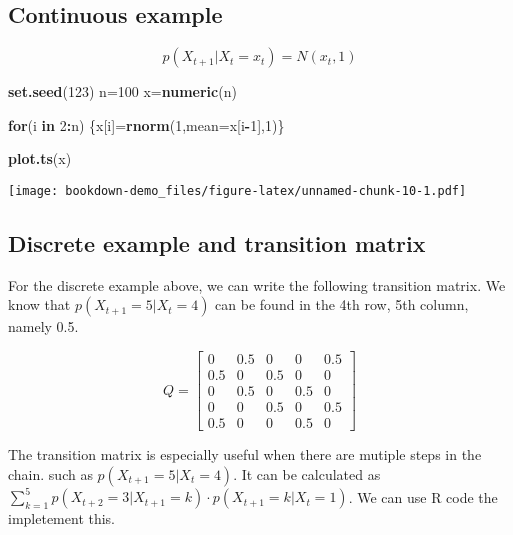 \documentclass[]{book}
\newenvironment{Shaded}{\begin{snugshade}}{\end{snugshade}}
\newcommand{\KeywordTok}[1]{\textcolor[rgb]{0.13,0.29,0.53}{\textbf{#1}}}
\newcommand{\DataTypeTok}[1]{\textcolor[rgb]{0.13,0.29,0.53}{#1}}
\newcommand{\DecValTok}[1]{\textcolor[rgb]{0.00,0.00,0.81}{#1}}
\newcommand{\ControlFlowTok}[1]{\textcolor[rgb]{0.13,0.29,0.53}{\textbf{#1}}}
\newcommand{\OperatorTok}[1]{\textcolor[rgb]{0.81,0.36,0.00}{\textbf{#1}}}
\newcommand{\NormalTok}[1]{#1}
\begin{document}
\subsection{Continuous example}\label{continuous-example}

\[p(X_{t+1}| X_t=x_t)=N(x_t,1)\]

\begin{Shaded}
\begin{Highlighting}[]
\KeywordTok{set.seed}\NormalTok{(}\DecValTok{123}\NormalTok{)}
\NormalTok{n=}\DecValTok{100}
\NormalTok{x=}\KeywordTok{numeric}\NormalTok{(n)}

\ControlFlowTok{for}\NormalTok{(i }\ControlFlowTok{in} \DecValTok{2}\OperatorTok{:}\NormalTok{n)}
\NormalTok{\{x[i]=}\KeywordTok{rnorm}\NormalTok{(}\DecValTok{1}\NormalTok{,}\DataTypeTok{mean=}\NormalTok{x[i}\OperatorTok{-}\DecValTok{1}\NormalTok{],}\DecValTok{1}\NormalTok{)\}}

\KeywordTok{plot.ts}\NormalTok{(x)}
\end{Highlighting}
\end{Shaded}

\texttt{[image: bookdown-demo\_files/figure-latex/unnamed-chunk-10-1.pdf]}

\subsection{Discrete example and transition
matrix}\label{discrete-example-and-transition-matrix}

For the discrete example above, we can write the following transition
matrix. We know that \(p(X_{t+1}=5 | X_t=4)\) can be found in the 4th
row, 5th column, namely 0.5.

\[Q=\begin{bmatrix} 0 & 0.5 & 0 & 0 & 0.5 \\ 0.5 & 0 & 0.5 & 0 & 0\\ 0 & 0.5 & 0 & 0.5 & 0 \\ 0& 0 & 0.5& 0& 0.5\\ 0.5 & 0& 0 &0.5 & 0 \end{bmatrix}\]

The transition matrix is especially useful when there are mutiple steps
in the chain. such as \(p(X_{t+1}=5| X_t=4)\). It can be calculated as
\(\sum_{k=1}^{5} p(X_{t+2}=3|X_{t+1}=k) \cdot p(X_{t+1}=k |X_t=1)\). We
can use R code the impletement this.
\end{document}
